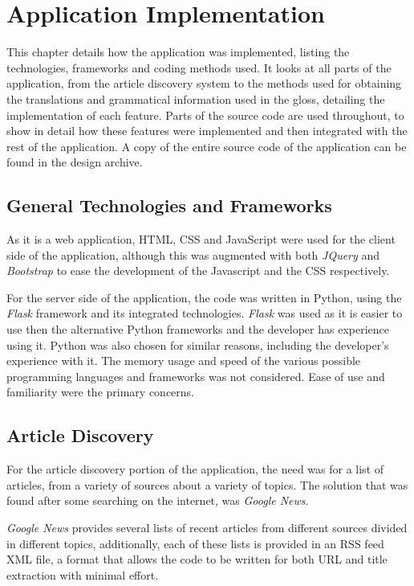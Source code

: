 
\chapter{Application Implementation}

This chapter details how the application was implemented, listing the technologies, frameworks and coding methods used. It looks at all parts of the application, from the article discovery system to the methods used for obtaining the translations and grammatical information used in the gloss, detailing the implementation of each feature. Parts of the source code are used throughout, to show in detail how these features were implemented and then integrated with the rest of the application. A copy of the entire source code of the application can be found in the design archive.

\section{General Technologies and Frameworks}

As it is a web application, HTML, CSS and JavaScript were used for the client side of the application, although this was augmented with both \textit{JQuery} and \textit{Bootstrap} to ease the development of the Javascript and the CSS respectively. 

For the server side of the application, the code was written in Python, using the \textit{Flask} framework and its integrated technologies. \textit{Flask} was used as it is easier to use then the alternative Python frameworks and the developer has experience using it. Python was also chosen for similar reasons, including the developer's experience with it. The memory usage and speed of the various possible programming languages and frameworks was not considered. Ease of use and familiarity were the primary concerns. 

\section{Article Discovery}

For the article discovery portion of the application, the need was for a list of articles, from a variety of sources about a variety of topics. The solution that was found after some searching on the internet, was \textit{Google News}.

\textit{Google News} provides several lists of recent articles from different sources divided in different topics, additionally, each of these lists is provided in an RSS feed XML file, a format that allows the code to be written for both URL and title extraction with minimal effort.

